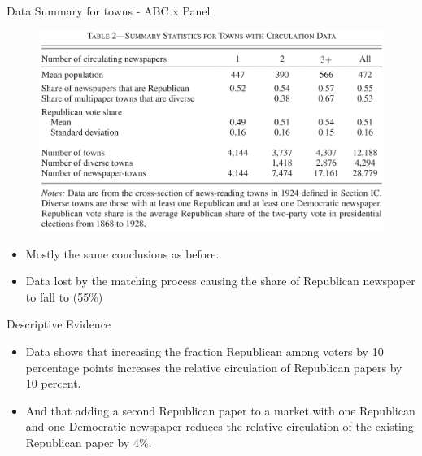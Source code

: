 \documentclass{beamer}
\begin{document}
\begin{frame}[t]{Data Summary for towns - ABC x Panel}
  \begin{figure}
  \begin{center}
    \includegraphics[scale=0.14]{Table2.png}
  \end{center}
  \end{figure}

  \begin{itemize}
    \item Mostly the same conclusions as before.
    \item Data lost by the matching process causing the share of Republican
      newspaper to fall to (55\%)
  \end{itemize}

\end{frame}

\begin{frame}[t]{Descriptive Evidence}
  \begin{itemize}
    \item Data shows that increasing the fraction Republican among voters
      by 10 percentage points increases the relative circulation of Republican
      papers by 10 percent.
    \item And that adding a second Republican paper to a market with one Republican and one Democratic newspaper reduces the relative circulation of the existing Republican paper by 4\%.
  \end{itemize}
\end{frame}
\end{document}
